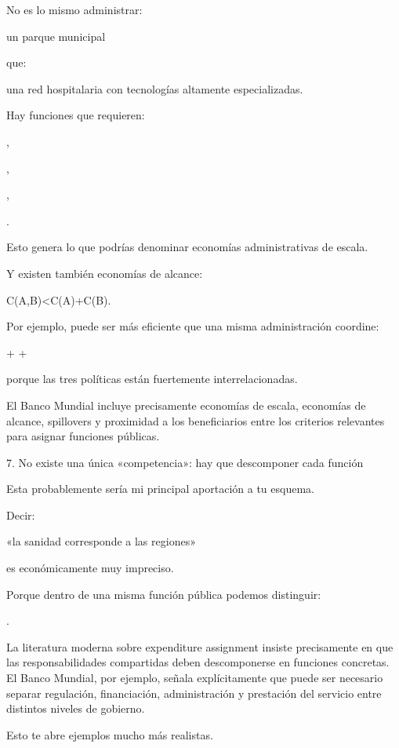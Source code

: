 \documentclass[10pt,a4paper]{article}
\begin{document}
No es lo mismo administrar:

un parque municipal

que:

una red hospitalaria con tecnologías altamente especializadas.

Hay funciones que requieren:

,

,

,

.

Esto genera lo que podrías denominar economías administrativas de escala.

Y existen también economías de alcance:

C(A,B)<C(A)+C(B).

Por ejemplo, puede ser más eficiente que una misma administración coordine:

+
+

porque las tres políticas están fuertemente interrelacionadas.

El Banco Mundial incluye precisamente economías de escala, economías de alcance, spillovers y proximidad a los beneficiarios entre los criterios relevantes para asignar funciones públicas.  


7. No existe una única «competencia»: hay que descomponer cada función

Esta probablemente sería mi principal aportación a tu esquema.

Decir:

«la sanidad corresponde a las regiones»

es económicamente muy impreciso.

Porque dentro de una misma función pública podemos distinguir:

\neq
{}
\neq
{}
\neq
{}
\neq
{}.

La literatura moderna sobre expenditure assignment insiste precisamente en que las responsabilidades compartidas deben descomponerse en funciones concretas. El Banco Mundial, por ejemplo, señala explícitamente que puede ser necesario separar regulación, financiación, administración y prestación del servicio entre distintos niveles de gobierno.  

Esto te abre ejemplos mucho más realistas.
\end{document}
